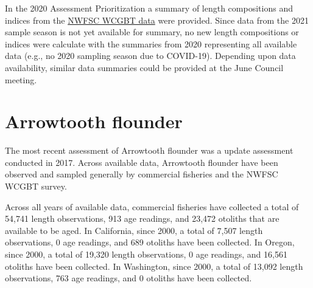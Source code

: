\documentclass[11pt,
  english,
  letterpaper,
]{article}
\begin{document}
\leavevmode\tagmcend\tagstructend\par


In the 2020 Assessment Prioritization a summary of length compositions and indices from the {\href{https://www.pcouncil.org/documents/2020/05/f-2-attachment-1-summary-of-the-nwfsc-west-coast-groundfish-bottom-trawl-survey-data-for-select-species-from-2003-2019.pdf/}{NWFSC WCGBT data}\leavevmode\tagmcend\tagstructend} were provided. Since data from the 2021 sample season is not yet available for summary, no new length compositions or indices were calculate with the summaries from 2020 representing all available data (e.g., no 2020 sampling season due to COVID-19). Depending upon data availability, similar data summaries could be provided at the June Council meeting.

\leavevmode\tagmcend\tagstructend\par

\newpage


\hypertarget{arrowtooth-flounder}{%
\section{Arrowtooth flounder}\label{arrowtooth-flounder}}

\leavevmode\tagmcend\tagstructend


The most recent assessment of Arrowtooth flounder was a update assessment conducted in 2017. Across available data, Arrowtooth flounder have been observed and sampled generally by commercial fisheries and the NWFSC WCGBT survey.

\leavevmode\tagmcend\tagstructend\par


Across all years of available data, commercial fisheries have collected a total of 54,741 length observations, 913 age readings, and 23,472 otoliths that are available to be aged. In California, since 2000, a total of 7,507 length observations, 0 age readings, and 689 otoliths have been collected. In Oregon, since 2000, a total of 19,320 length observations, 0 age readings, and 16,561 otoliths have been collected. In Washington, since 2000, a total of 13,092 length observations, 763 age readings, and 0 otoliths have been collected.
\end{document}
